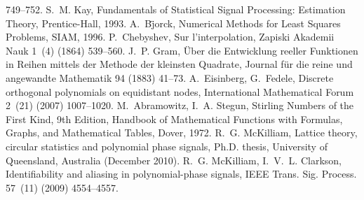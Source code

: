 \documentclass[review]{elsarticle}
\begin{document}
\begin{thebibliography}{10}
  749--752.
S.~M. Kay, Fundamentals of Statistical Signal Processing: Estimation Theory,
  Prentice-Hall, 1993.
A.~B\"{j}orck, Numerical Methods for Least Squares Problems, SIAM, 1996.
P.~Chebyshev, Sur l'interpolation, Zapiski Akademii Nauk 1~(4) (1864) 539--560.
J.~P. Gram, {\"{U}ber die Entwicklung reeller Funktionen in Reihen mittels der
  Methode der kleinsten Quadrate}, Journal f\"{u}r die reine und angewandte
  Mathematik 94 (1883) 41--73.
A.~Eisinberg, G.~Fedele, Discrete orthogonal polynomials on equidistant nodes,
  International Mathematical Forum 2~(21) (2007) 1007--1020.
M.~Abramowitz, I.~A. Stegun, Stirling Numbers of the First Kind, 9th Edition,
  Handbook of Mathematical Functions with Formulas, Graphs, and Mathematical
  Tables, Dover, 1972.
R.~G. McKilliam, Lattice theory, circular statistics and polynomial phase
  signals, Ph.D. thesis, University of Queensland, Australia (December 2010).
R.~G. McKilliam, I.~V.~L. Clarkson, Identifiability and aliasing in
  polynomial-phase signals, IEEE Trans. Sig. Process. 57~(11) (2009)
  4554--4557.

\end{thebibliography}



\end{document}
